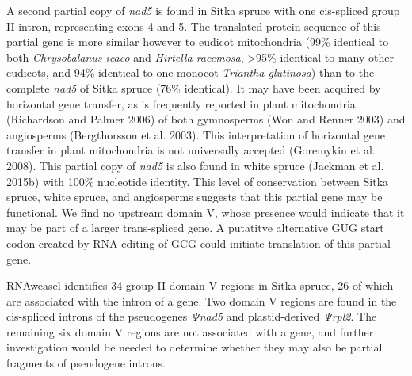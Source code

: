 \documentclass[
  12pt,
  oneside,
  openany]{book}
\begin{document}
A second partial copy of \emph{nad5} is found in Sitka spruce with one cis-spliced group II intron, representing exons 4 and 5. The translated protein sequence of this partial gene is more similar however to eudicot mitochondria (99\% identical to both \emph{Chrysobalanus icaco} and \emph{Hirtella racemosa}, \textgreater95\% identical to many other eudicots, and 94\% identical to one monocot \emph{Triantha glutinosa}) than to the complete \emph{nad5} of Sitka spruce (76\% identical). It may have been acquired by horizontal gene transfer, as is frequently reported in plant mitochondria (Richardson and Palmer 2006) of both gymnosperms (Won and Renner 2003) and angiosperms (Bergthorsson et al. 2003). This interpretation of horizontal gene transfer in plant mitochondria is not universally accepted (Goremykin et al. 2008). This partial copy of \emph{nad5} is also found in white spruce (Jackman et al. 2015b) with 100\% nucleotide identity. This level of conservation between Sitka spruce, white spruce, and angiosperms suggests that this partial gene may be functional. We find no upstream domain V, whose presence would indicate that it may be part of a larger trans-spliced gene. A putatitve alternative GUG start codon created by RNA editing of GCG could initiate translation of this partial gene.

RNAweasel identifies 34 group II domain V regions in Sitka spruce, 26 of which are associated with the intron of a gene. Two domain V regions are found in the cis-spliced introns of the pseudogenes \emph{Ψnad5} and plastid-derived \emph{Ψrpl2}. The remaining six domain V regions are not associated with a gene, and further investigation would be needed to determine whether they may also be partial fragments of pseudogene introns.
\end{document}
